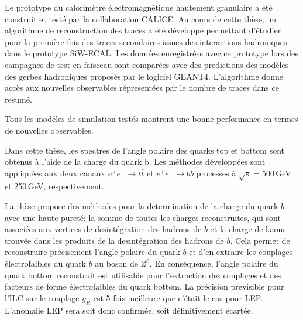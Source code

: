 Le prototype du calorim\`etre \'electromagn\'etique hautement granulaire a été construit et testé par la collaboration CALICE.
Au cours de cette thèse, un algorithme de reconstruction des traces a été développé permettant d'étudier pour la première fois des traces secondaires issues des interactions hadroniques dans le prototype SiW-ECAL.
Les données enregistrées avec ce prototype lors des campagnes de test en faisceau sont comparées avec des predictions des modèles des gerbes hadroniques proposés par le logiciel GEANT4. L'algorithme donne accès aux nouvelles observables répresentées par le nombre de traces dans ce resumé. 


Tous les modèles de simulation testés montrent une bonne performance en termes de nouvelles observables.

Dans cette thèse, les spectres de l'angle polaire des quarks top et bottom sont obtenus à l'aide de la charge du quark b.  
Les méthodes développées sont appliquées aux deux canaux $e^+ e^- \to t\bar{t}$ et $e^+ e^- \to b\bar{b}$ processes à $\sqrt {s} = 500$\,GeV et 250\,GeV, respectivement.

La thèse propose des méthodes pour la determination de la charge du quark $b$ avec une haute pureté: la somme de toutes les charges reconstruites, qui sont associées aux vertices de desintégration des hadrons de $b$ et la charge de kaons trouvée dans les produits de la desintégration des hadrons de $b$. 
Cela permet de reconstruire précisement l'angle polaire du quark $b$ et d'en extraire les couplages électrofaibles du quark $b$ au boson de $Z^0$. %
En conséquence, l'angle polaire du quark bottom reconstruit est utilisable pour l'extraction des couplages  et des facteurs de forme électrofaibles du quark bottom.
La précision previsible pour l'ILC sur le couplage $g_R$ est 5 fois meilleure que c'\'etait le cas pour LEP. L'anomalie LEP sera soit donc confirmée, soit définitivement écartée.


